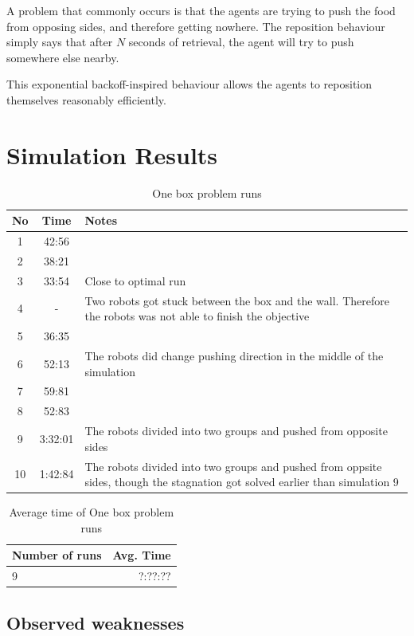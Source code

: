 \documentclass[a4paper]{article}
\begin{document}
A problem that commonly occurs is that the agents are trying to push the food from opposing sides, and therefore getting nowhere.
The reposition behaviour simply says that after $ N $ seconds of retrieval, the agent will try to push somewhere else nearby.

This exponential backoff-inspired behaviour allows the agents to reposition themselves reasonably efficiently.

\section{Simulation Results}
\begin{table}[H]
\centering
\begin{tabular}{ c | c | p{5cm}}
\hline No & Time & Notes \\ \hline
 1 & 42:56 &  \\ \hline
 2 & 38:21 & \\ \hline
 3 & 33:54 & Close to optimal run \\ \hline
4 & - & Two robots got stuck between the box and the wall. Therefore the robots was not able to finish the objective \\ \hline
5 & 36:35 & \\ \hline
6	& 52:13 & The robots did change pushing direction in the middle of the simulation \\ \hline
7 & 59:81 & \\ \hline
8 & 52:83 & \\ \hline
9 & 3:32:01 &  The robots divided into two groups and pushed from opposite sides \\ \hline
10 & 1:42:84 & The robots divided into two groups and pushed from oppsite sides, though the stagnation got solved earlier than simulation 9 \\
\end{tabular}
\caption{One box problem runs}
\end{table}


\begin{table}
\centering
\begin{tabular}{ l | r}
\hline Number of runs & Avg. Time \\ \hline
9 & ?:??:?? \\
\end{tabular}
\caption{ Average time of One box problem runs}
\end{table}


\subsection{Observed weaknesses}
\end{document}
